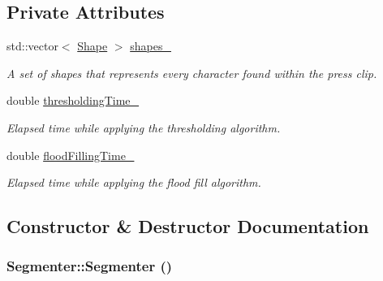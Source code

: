 \subsection*{Private Attributes}
\begin{CompactItemize}
\item 
\hypertarget{class_segmenter_3040cc000907ef44e820ddcf70de6f08}{
std::vector$<$ \hyperlink{class_shape}{Shape} $>$ \hyperlink{class_segmenter_3040cc000907ef44e820ddcf70de6f08}{shapes\_\-}}
\label{class_segmenter_3040cc000907ef44e820ddcf70de6f08}

\begin{CompactList}\small\item\em A set of shapes that represents every character found within the press clip. \item\end{CompactList}\item 
\hypertarget{class_segmenter_13c768c0dfa734bb6ca0c548511bc7bb}{
double \hyperlink{class_segmenter_13c768c0dfa734bb6ca0c548511bc7bb}{thresholdingTime\_\-}}
\label{class_segmenter_13c768c0dfa734bb6ca0c548511bc7bb}

\begin{CompactList}\small\item\em Elapsed time while applying the thresholding algorithm. \item\end{CompactList}\item 
\hypertarget{class_segmenter_9f24d008767ba4741cf3d1e599ee119a}{
double \hyperlink{class_segmenter_9f24d008767ba4741cf3d1e599ee119a}{floodFillingTime\_\-}}
\label{class_segmenter_9f24d008767ba4741cf3d1e599ee119a}

\begin{CompactList}\small\item\em Elapsed time while applying the flood fill algorithm. \item\end{CompactList}\end{CompactItemize}


\subsection{Constructor \& Destructor Documentation}
\hypertarget{class_segmenter_d39ec3bda31be180820aa0bdca7b125d}{
\subsubsection[Segmenter]{\setlength{\rightskip}{0pt plus 5cm}Segmenter::Segmenter ()}}
\label{class_segmenter_d39ec3bda31be180820aa0bdca7b125d}


